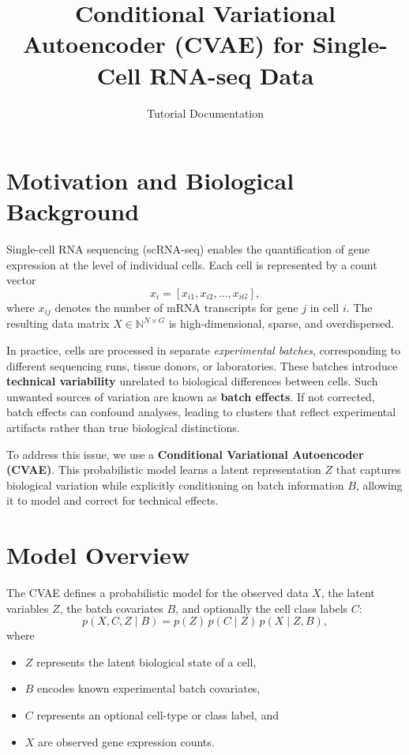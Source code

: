 \documentclass[11pt,a4paper]{article}
\title{Conditional Variational Autoencoder (CVAE) for Single-Cell RNA-seq Data}
\author{Tutorial Documentation}
\date{}
\begin{document}
\maketitle

\section{Motivation and Biological Background}

Single-cell RNA sequencing (scRNA-seq) enables the quantification of gene expression at the level of individual cells. Each cell is represented by a count vector
\[
x_i = [x_{i1}, x_{i2}, \ldots, x_{iG}],
\]
where $x_{ij}$ denotes the number of mRNA transcripts for gene $j$ in cell $i$. The resulting data matrix $X \in \mathbb{N}^{N \times G}$ is high-dimensional, sparse, and overdispersed.

In practice, cells are processed in separate \emph{experimental batches}, corresponding to different sequencing runs, tissue donors, or laboratories. These batches introduce \textbf{technical variability} unrelated to biological differences between cells. Such unwanted sources of variation are known as \textbf{batch effects}. If not corrected, batch effects can confound analyses, leading to clusters that reflect experimental artifacts rather than true biological distinctions.

To address this issue, we use a \textbf{Conditional Variational Autoencoder (CVAE)}. This probabilistic model learns a latent representation $Z$ that captures biological variation while explicitly conditioning on batch information $B$, allowing it to model and correct for technical effects.

\section{Model Overview}

The CVAE defines a probabilistic model for the observed data $X$, the latent variables $Z$, the batch covariates $B$, and optionally the cell class labels $C$:
\[
p(X, C, Z \mid B) = p(Z)\,p(C \mid Z)\,p(X \mid Z, B),
\]
where
\begin{itemize}
  \item $Z$ represents the latent biological state of a cell,
  \item $B$ encodes known experimental batch covariates,
  \item $C$ represents an optional cell-type or class label, and
  \item $X$ are observed gene expression counts.
\end{itemize}
\end{document}
